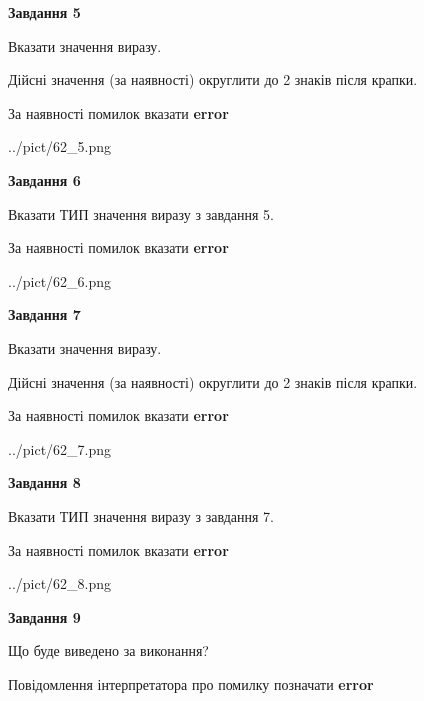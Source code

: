 \documentclass[11pt, ukrainian]{article}
\begin{document}
{\begin {large}
{\begin {center}\textbf{Завдання 5}\end {center}}\par
Вказати значення виразу. \par
Дійсні значення (за наявності) округлити до 2 знаків після крапки. \par
За наявності помилок вказати \textbf{error}

\begin{center}
	{../pict/62_5.png}
\end{center}
\newpage

{\begin {center}\textbf{Завдання 6}\end {center}}\par
Вказати ТИП значення виразу з завдання 5. \par
За наявності помилок вказати \textbf{error}

\begin{center}
	{../pict/62_6.png}
\end{center}
\newpage

{\begin {center}\textbf{Завдання 7}\end {center}}\par
Вказати значення виразу. \par
Дійсні значення (за наявності) округлити до 2 знаків після крапки. \par
За наявності помилок вказати \textbf{error}

\begin{center}
	{../pict/62_7.png}
\end{center}
\newpage

{\begin {center}\textbf{Завдання 8}\end {center}}\par
Вказати ТИП значення виразу з завдання 7. \par
За наявності помилок вказати \textbf{error}

\begin{center}
	{../pict/62_8.png}
\end{center}
\newpage

{\begin {center}\textbf{Завдання 9}\end {center}}\par
Що буде виведено за виконання? \par
Повідомлення інтерпретатора про помилку позначати \textbf{error}


\end{large}}
\end{document}
